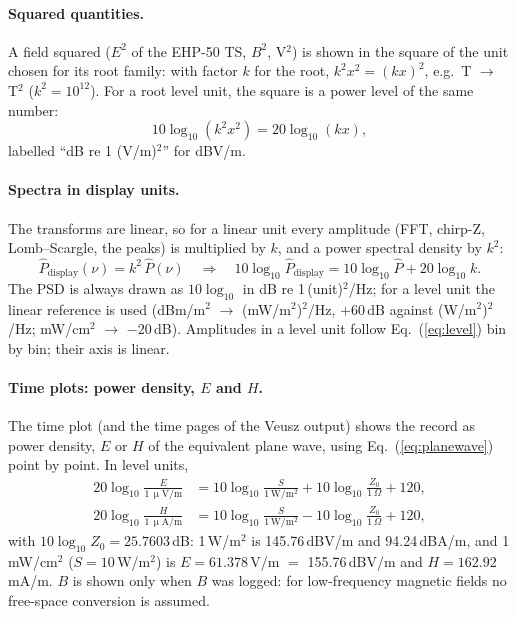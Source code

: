 \documentclass[10pt,letterpaper]{article}
\numberwithin{equation}{section}
\begin{document}
\paragraph{Squared quantities.}
A field squared ($E^2$ of the EHP-50 TS, $B^2$, \textmu V$^2$) is shown in the
square of the unit chosen for its root family: with factor $k$ for the root,
$k^2 x^2 = (k x)^2$, e.g.\ \textmu T $\rightarrow$ \textmu T$^2$ ($k^2 = 10^{12}$).
For a root level unit, the square is a power level of the same number:
\begin{equation}
10\log_{10}\!\left(k^2 x^2\right) = 20\log_{10}(k x),
\end{equation}
labelled ``dB re 1 (\textmu V/m)$^2$'' for dB\textmu V/m.

\paragraph{Spectra in display units.}
The transforms are linear, so for a linear unit every amplitude (FFT, chirp-Z,
Lomb--Scargle, the peaks) is multiplied by $k$, and a power spectral density by
$k^2$:
\begin{equation}
\hat{P}_\text{display}(\nu) = k^2\,\hat{P}(\nu)
\quad\Rightarrow\quad
10\log_{10}\hat{P}_\text{display} = 10\log_{10}\hat{P} + 20\log_{10}k .
\end{equation}
The PSD is always drawn as $10\log_{10}$ in dB re 1\,(unit)$^2$/Hz; for a level
unit the linear reference is used (dBm/m$^2$ $\rightarrow$ (mW/m$^2$)$^2$/Hz,
$+60$\,dB against (W/m$^2$)$^2$/Hz; mW/cm$^2$ $\rightarrow$ $-20$\,dB). Amplitudes in
a level unit follow Eq.~(\ref{eq:level}) bin by bin; their axis is linear.

\paragraph{Time plots: power density, $E$ and $H$.}
The time plot (and the time pages of the Veusz output) shows the record as power
density, $E$ or $H$ of the equivalent plane wave, using Eq.~(\ref{eq:planewave})
point by point. In level units,
\begin{align}
20\log_{10}\frac{E}{1\,\mathrm{\upmu V/m}} &= 10\log_{10}\frac{S}{1\,\mathrm{W/m^2}}
 + 10\log_{10}\frac{Z_0}{1\,\Omega} + 120 ,\\
20\log_{10}\frac{H}{1\,\mathrm{\upmu A/m}} &= 10\log_{10}\frac{S}{1\,\mathrm{W/m^2}}
 - 10\log_{10}\frac{Z_0}{1\,\Omega} + 120 ,
\end{align}
with $10\log_{10}Z_0 = 25.7603$\,dB: 1\,W/m$^2$ is
145.76\,dB\textmu V/m and 94.24\,dB\textmu A/m, and 1\,mW/cm$^2$
($S = 10$\,W/m$^2$) is $E = 61.378$\,V/m $=$ 155.76\,dB\textmu V/m and
$H = 162.92$\,mA/m. $B$ is shown only when $B$ was logged: for
low-frequency magnetic fields no free-space conversion is assumed.
\end{document}
